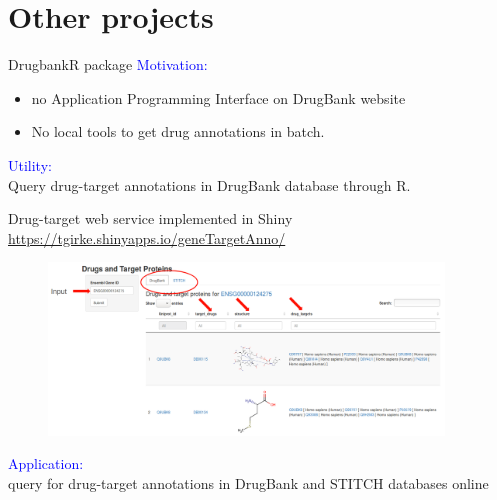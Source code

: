 \documentclass[10pt]{beamer}
\begin{document}
\section{Other projects}
\begin{frame}{DrugbankR package}
\vspace{-1.6cm}
\textcolor{blue}{Motivation:} \\
    \begin{itemize}
        \item no Application Programming Interface on DrugBank website
        \item No local tools to get drug annotations in batch.
    \end{itemize}
\vspace{0.6cm}
\textcolor{blue}{Utility:} \\
Query drug-target annotations in DrugBank database through R. 
\end{frame}
\begin{frame}{Drug-target web service implemented in Shiny}
\vspace{-0.6cm}
\textcolor{blue}{\href{https://tgirke.shinyapps.io/geneTargetAnno/}{https://tgirke.shinyapps.io/geneTargetAnno/}}
    \begin{figure}
        \includegraphics[width=10.5cm]{demo/images/shiny.png}
    \end{figure}
\vspace{-0.5cm}
\textcolor{blue}{Application:} \\
query for drug-target annotations in DrugBank and STITCH databases online \\
\end{frame}
\end{document}
